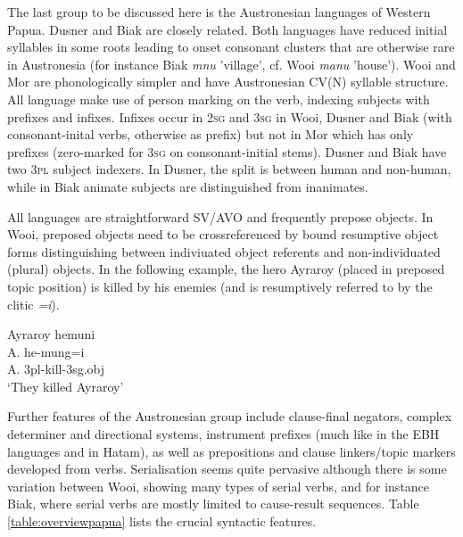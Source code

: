 The last group to be discussed here is the Austronesian languages of Western Papua. Dusner and Biak are closely related. Both languages have reduced initial syllables in some roots leading to onset consonant clusters that are otherwise rare in Austronesia (for instance Biak \textit{mnu} 'village', cf. Wooi \textit{manu} 'house'). Wooi and Mor are phonologically simpler and have Austronesian CV(N) syllable structure. All language make use of person marking on the verb, indexing subjects with prefixes and infixes. Infixes occur in \textsc{2sg} and \textsc{3sg} in Wooi, Dusner and Biak (with consonant-inital verbs, otherwise as prefix) but not in Mor which has only prefixes (zero-marked for \textsc{3sg} on consonant-initial stems). Dusner and Biak have two \textsc{3pl} subject indexers. In Dusner, the split is between human and non-human, while in Biak animate subjects are distinguished from inanimates.

All languages are straightforward SV/AVO and frequently prepose objects. In Wooi, preposed objects need to be crossreferenced by bound resumptive object forms distinguishing between indiviuated object referents and non-individuated (plural) objects. In the following example, the hero Ayraroy (placed in preposed topic position) is killed by his enemies (and is resumptively referred to by the clitic \textit{=i}).

\ea 
\gll Ayraroy hemuni \\
A. he-mung=i \\
\glc A. \acs{3}\acs{pl}-kill-\acs{3}\acs{sg}.\acs{obj} \\
\glft `They killed Ayraroy' \\ 
\z
\xe

Further features of the Austronesian group include clause-final negators, complex determiner and directional systems, instrument prefixes (much like in the EBH languages and in Hatam), as well as prepositions and clause linkers/topic markers developed from verbs. Serialisation seems quite pervasive although there is some variation between Wooi, showing many types of serial verbs, and for instance Biak, where serial verbs are mostly limited to cause-result sequences. Table \ref{table:overviewpapua} lists the crucial syntactic features.

